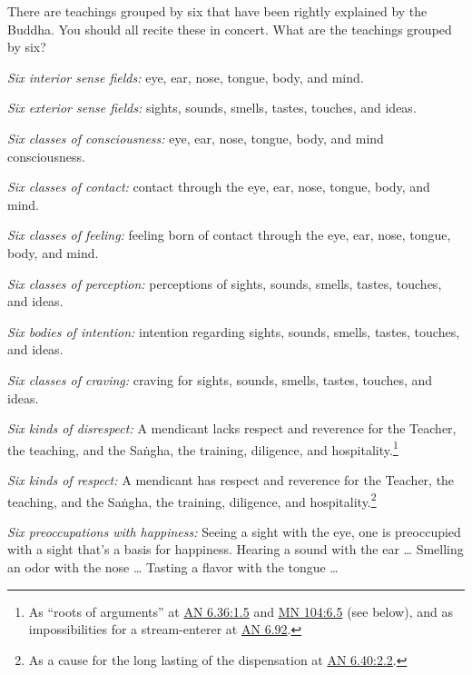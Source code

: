 \documentclass[12pt,openany]{book}%
\begin{document}
There are teachings grouped by six that have been rightly explained by the Buddha. You should all recite these in concert. What are the teachings grouped by six? 

\emph{Six interior sense fields:} eye, ear, nose, tongue, body, and mind. 

\emph{Six exterior sense fields:} sights, sounds, smells, tastes, touches, and ideas. 

\emph{Six classes of consciousness:} eye, ear, nose, tongue, body, and mind consciousness. 

\emph{Six classes of contact:} contact through the eye, ear, nose, tongue, body, and mind. 

\emph{Six classes of feeling:} feeling born of contact through the eye, ear, nose, tongue, body, and mind. 

\emph{Six classes of perception:} perceptions of sights, sounds, smells, tastes, touches, and ideas. 

\emph{Six bodies of intention:} intention regarding sights, sounds, smells, tastes, touches, and ideas. 

\emph{Six classes of craving:} craving for sights, sounds, smells, tastes, touches, and ideas. 

\emph{Six kinds of disrespect:} A mendicant lacks respect and reverence for the Teacher, the teaching, and the \textsanskrit{Saṅgha}, the training, diligence, and hospitality.\footnote{As “roots of arguments” at \href{https://suttacentral.net/an6.36/en/sujato\#1.5}{AN 6.36:1.5} and \href{https://suttacentral.net/mn104/en/sujato\#6.5}{MN 104:6.5} (see below), and as impossibilities for a stream-enterer at \href{https://suttacentral.net/an6.92/en/sujato}{AN 6.92}. } 

\emph{Six kinds of respect:} A mendicant has respect and reverence for the Teacher, the teaching, and the \textsanskrit{Saṅgha}, the training, diligence, and hospitality.\footnote{As a cause for the long lasting of the dispensation at \href{https://suttacentral.net/an6.40/en/sujato\#2.2}{AN 6.40:2.2}. } 

\emph{Six preoccupations with happiness:} Seeing a sight with the eye, one is preoccupied with a sight that’s a basis for happiness. Hearing a sound with the ear … Smelling an odor with the nose … Tasting a flavor with the tongue … 
\end{document}

